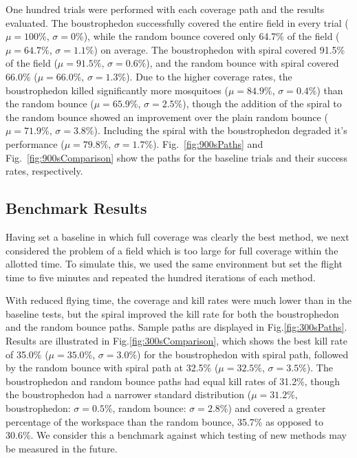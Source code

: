 \documentclass[letterpaper, 10 pt, conference]{ieeeconf}  %
\begin{document}
One hundred trials were performed with each coverage path and the results evaluated.  The boustrophedon successfully covered the entire field in every trial ($\mu=100\%$, $\sigma=0\%$), while the random bounce covered only 64.7\% of the field ($\mu=64.7\%$, $\sigma=1.1\%$) on average.  The boustrophedon with spiral covered 91.5\% of the field ($\mu=91.5\%$, $\sigma=0.6\%$), and the random bounce with spiral covered 66.0\% ($\mu=66.0\%$, $\sigma=1.3\%$).  Due to the higher coverage rates, the boustrophedon killed significantly more mosquitoes ($\mu=84.9\%$, $\sigma=0.4\%$) than the random bounce ($\mu=65.9\%$, $\sigma=2.5\%$), though the addition of the spiral to the random bounce showed an improvement over the plain random bounce ($\mu=71.9\%$, $\sigma=3.8\%$).  Including the spiral with the boustrophedon degraded it’s performance ($\mu=79.8\%$, $\sigma=1.7\%$).  Fig.~\ref{fig:900sPaths} and Fig.~\ref{fig:900sComparison} show the paths for the baseline trials and their success rates, respectively.

\subsection{Benchmark Results} \label{subsec:SimulationResults2}

Having set a baseline in which full coverage was clearly the best method, we next considered the problem of a field which is too large for full coverage within the allotted time.  To simulate this, we used the same environment but set the flight time to five minutes and repeated the hundred iterations of each method.  

With reduced flying time, the coverage and kill rates were much lower than in the baseline tests, but the spiral improved the kill rate for both the boustrophedon and the random bounce paths.  Sample paths are displayed in Fig.\ref{fig:300sPaths}.  Results are illustrated in Fig.\ref{fig:300sComparison}, which shows the best kill rate of 35.0\% ($\mu=35.0\%$, $\sigma=3.0\%$) for the boustrophedon with spiral path, followed by the random bounce with spiral path at 32.5\% ($\mu=32.5\%$, $\sigma=3.5\%$).  The boustrophedon and random bounce paths had equal kill rates of 31.2\%, though the boustrophedon had a narrower standard distribution ($\mu=31.2\%$, boustrophedon:  $\sigma=0.5\%$, random bounce:  $\sigma=2.8\%$) and covered a greater percentage of the workspace than the random bounce, 35.7\% as opposed to 30.6\%.  We consider this a benchmark against which testing of new methods may be measured in the future.
\end{document}
